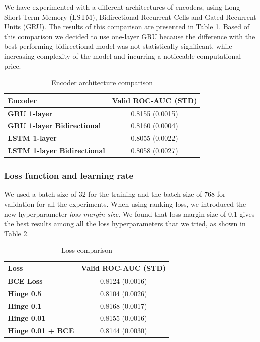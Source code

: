 \documentclass[sigconf]{acmart}
\begin{document}
We have experimented with a different architectures of encoders, using Long Short Term Memory (LSTM), Bidirectional Recurrent Cells \cite{schuster1997bidirectional} and Gated Recurrent Units (GRU). The results of this comparison are presented in Table \ref{tab-enc-arch}. Based of this comparison we decided to use one-layer GRU because the difference with the best performing bidirectional model was not statistically significant, while increasing complexity of the model and incurring a noticeable computational price.

\begin{table}[ht]
\caption{Encoder architecture comparison}
\begin{tabular}{ | l | c |  }
\hline
\textbf{Encoder} & \textbf{Valid ROC-AUC (STD)} \\
\hline
\textbf{GRU 1-layer} & 0.8155 (0.0015)  \\
\textbf{GRU 1-layer Bidirectional} & 0.8160 (0.0004)  \\
\textbf{LSTM 1-layer} & 0.8055 (0.0022) \\
\textbf{LSTM 1-layer Bidirectional} & 0.8058 (0.0027)  \\

\hline
\end{tabular}
\label{tab-enc-arch}
\end{table}


\subsubsection{Loss function and learning rate}

We used a batch size of 32 for the training and the batch size of 768 for validation for all the experiments. When using ranking loss, we introduced the new hyperparameter \textit{loss margin size}. We found that loss margin size of 0.1 gives the best results among all the loss hyperparameters that we tried, as shown in Table \ref{tab-loss}. 

\begin{table}[ht]
\caption{Loss comparison}
\begin{tabular}{ | l | c |  }
\hline
\textbf{Loss} & \textbf{Valid ROC-AUC (STD)} \\
\hline
\textbf{BCE Loss} & 0.8124 (0.0016)  \\
\textbf{Hinge 0.5} & 0.8104 (0.0026)  \\
\textbf{Hinge 0.1} & 0.8168 (0.0017)  \\
\textbf{Hinge 0.01} & 0.8155 (0.0016)  \\
\textbf{Hinge 0.01 + BCE} & 0.8144 (0.0030)  \\
\hline
\end{tabular}
\label{tab-loss}
\end{table}
\end{document}
